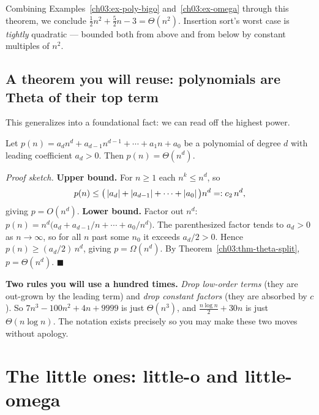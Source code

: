 Combining Examples~\ref{ch03:ex-poly-bigo} and~\ref{ch03:ex-omega} through this theorem,
we conclude $\frac12 n^2 + \frac52 n - 3 = \Theta(n^2)$. Insertion sort's worst case is
\emph{tightly} quadratic --- bounded both from above and from below by constant multiples of $n^2$.

\subsection{A theorem you will reuse: polynomials are Theta of their top term}

This generalizes into a foundational fact: we can read off the highest power.

\begin{formalbox}
\begin{theorem}\label{ch03:thm-poly}
Let $p(n) = a_d n^d + a_{d-1} n^{d-1} + \cdots + a_1 n + a_0$ be a polynomial of degree
$d$ with leading coefficient $a_d > 0$. Then $p(n) = \Theta(n^d)$.
\end{theorem}
\end{formalbox}

\begin{formalbox}
\emph{Proof sketch.} \textbf{Upper bound.} For $n \ge 1$ each $n^k \le n^d$, so
\[
  p(n) \le \bigl(\,\lvert a_d\rvert + \lvert a_{d-1}\rvert + \cdots + \lvert a_0\rvert\,\bigr) n^d =: c_2\, n^d,
\]
giving $p = O(n^d)$. \textbf{Lower bound.} Factor out $n^d$:
$p(n) = n^d\bigl(a_d + a_{d-1}/n + \cdots + a_0/n^d\bigr)$. The parenthesized factor
tends to $a_d > 0$ as $n\to\infty$, so for all $n$ past some $n_0$ it exceeds
$a_d/2 > 0$. Hence $p(n) \ge (a_d/2)\,n^d$, giving $p = \Omega(n^d)$. By
Theorem~\ref{ch03:thm-theta-split}, $p = \Theta(n^d)$. \hfill$\blacksquare$
\end{formalbox}

\begin{focusbox}
\textbf{Two rules you will use a hundred times.}
\emph{Drop low-order terms} (they are out-grown by the leading term) and
\emph{drop constant factors} (they are absorbed by $c$). So
$7n^3 - 100n^2 + 4n + 9999$ is just $\Theta(n^3)$, and
$\frac{n\log n}{2} + 30n$ is just $\Theta(n\log n)$. The notation exists precisely so
you may make these two moves without apology.
\end{focusbox}

\section{The little ones: little-o and little-omega}


